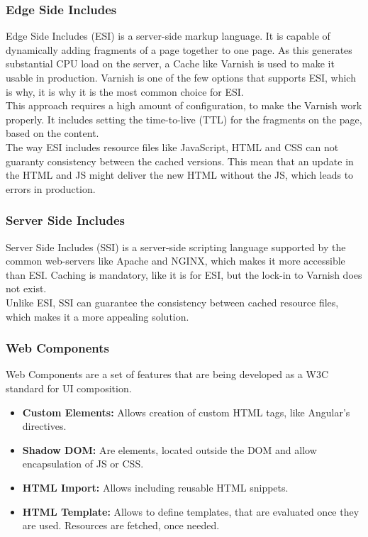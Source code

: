\subsubsection{Edge Side Includes}
Edge Side Includes (ESI) is a server-side markup language. It is capable of dynamically adding fragments of a page together to one page. As this generates substantial CPU load on the server, a Cache like Varnish is used to make it usable in production. Varnish is one of the few options that supports ESI, which is why, it is why it is the most common choice for ESI.\\
This approach requires a high amount of configuration, to make the Varnish work properly. It includes setting the time-to-live (TTL) for the fragments on the page, based on the content.\\
The way ESI includes resource files like JavaScript, HTML and CSS can not guaranty consistency between the cached versions. This mean that an update in the HTML and JS might deliver the new HTML without the JS, which leads to errors in production.

\subsubsection{Server Side Includes}
Server Side Includes (SSI) is a server-side scripting language supported by the common web-servers like Apache and NGINX, which makes it more accessible than ESI. Caching is mandatory, like it is for ESI, but the lock-in to Varnish does not exist.\\
Unlike ESI, SSI can guarantee the consistency between cached resource files, which makes it a more appealing solution.


\subsubsection{Web Components}
Web Components are a set of features that are being developed as a W3C standard for UI composition.
\begin{itemize}
	\item \textbf{Custom Elements:} Allows creation of custom HTML tags, like Angular's directives.
	\item \textbf{Shadow DOM:} Are elements, located outside the DOM and allow encapsulation of JS or CSS.
	\item \textbf{HTML Import:} Allows including reusable HTML snippets.
	\item \textbf{HTML Template:} Allows to define templates, that are evaluated once they are used. Resources are fetched, once needed.
\end{itemize}

